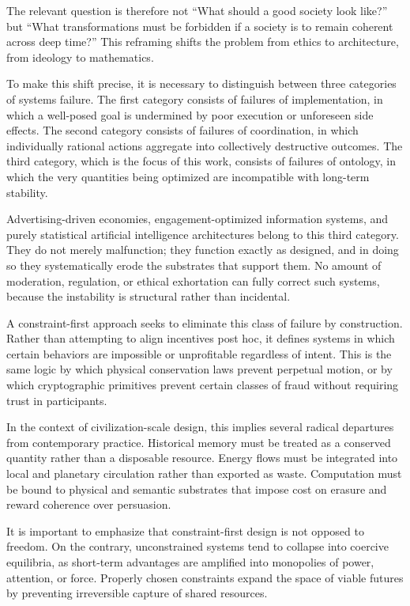 \documentclass[12pt,oneside]{book}
\begin{document}
The relevant question is therefore not ``What should a good society look like?'' but ``What transformations must be forbidden if a society is to remain coherent across deep time?'' This reframing shifts the problem from ethics to architecture, from ideology to mathematics.

To make this shift precise, it is necessary to distinguish between three categories of systems failure. The first category consists of failures of implementation, in which a well-posed goal is undermined by poor execution or unforeseen side effects. The second category consists of failures of coordination, in which individually rational actions aggregate into collectively destructive outcomes. The third category, which is the focus of this work, consists of failures of ontology, in which the very quantities being optimized are incompatible with long-term stability.

Advertising-driven economies, engagement-optimized information systems, and purely statistical artificial intelligence architectures belong to this third category. They do not merely malfunction; they function exactly as designed, and in doing so they systematically erode the substrates that support them. No amount of moderation, regulation, or ethical exhortation can fully correct such systems, because the instability is structural rather than incidental.

A constraint-first approach seeks to eliminate this class of failure by construction. Rather than attempting to align incentives post hoc, it defines systems in which certain behaviors are impossible or unprofitable regardless of intent. This is the same logic by which physical conservation laws prevent perpetual motion, or by which cryptographic primitives prevent certain classes of fraud without requiring trust in participants.

In the context of civilization-scale design, this implies several radical departures from contemporary practice. Historical memory must be treated as a conserved quantity rather than a disposable resource. Energy flows must be integrated into local and planetary circulation rather than exported as waste. Computation must be bound to physical and semantic substrates that impose cost on erasure and reward coherence over persuasion.

It is important to emphasize that constraint-first design is not opposed to freedom. On the contrary, unconstrained systems tend to collapse into coercive equilibria, as short-term advantages are amplified into monopolies of power, attention, or force. Properly chosen constraints expand the space of viable futures by preventing irreversible capture of shared resources.
\end{document}
